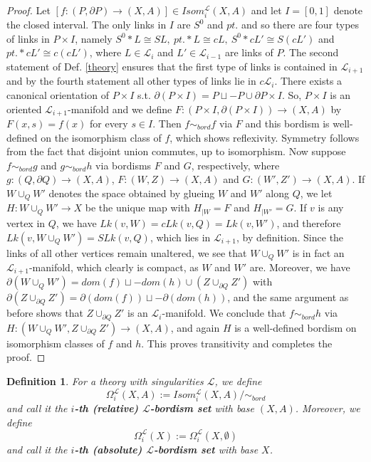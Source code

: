 \documentclass{scrreprt}
\newtheorem{definition}[prop]{Definition}
\begin{document}
\begin{proof}
Let $[f: (P, \partial P) \to (X,A)] \in Isom_{i}^{\mathcal{L}}(X,A)$ and let $I=[0,1]$ denote the closed interval. The only links in $I$ are $S^0$ and $pt.$ and so there are four types of links in $P \times I$, namely $S^0 * L \cong SL,\  pt. * L \cong cL,\  S^0 * cL' \cong S(cL')$ and $pt. * cL' \cong c(cL')$, where $L \in \mathcal{L}_i$ and $L' \in \mathcal{L}_{i-1}$ are links of $P$. The second statement of Def. \ref{theory} ensures that the first type of links is contained in $\mathcal{L}_{i+1}$ and by the fourth statement all other types of links lie in $c \mathcal{L}_i$. There exists a canonical orientation of $P \times I$ s.t. $\partial (P \times I)= P \sqcup -P \cup \partial P \times I$. So, $P \times I$ is an oriented $\mathcal{L}_{i+1}$-manifold and we define $F: (P \times I, \partial(P \times I)) \to (X,A)$ by $F(x,s)=f(x)$ for every $s \in I$. Then $f \sim_{bord} f$ via $F$ and this bordism is well-defined on the isomorphism class of $f$, which shows reflexivity. Symmetry follows from the fact that disjoint union commutes, up to isomorphism. Now suppose $f \sim_{bord} g$ and $g \sim_{bord} h$ via bordisms $F$ and $G$, respectively, where $g: (Q, \partial Q) \to (X,A)$, $F: (W,Z) \to (X,A)$ and $G: (W',Z') \to (X,A)$. If $W \cup_{Q} W'$ denotes the space obtained by glueing $W$ and $W'$ along $Q$, we let $H: W \cup_{Q} W' \to X$ be the unique map with $H_{|W} = F$ and $H_{|W'}=G$. If $v$ is any vertex in $Q$, we have $Lk(v,W)=cLk(v,Q)=Lk(v,W')$, and therefore $Lk(v,W \cup_{Q} W') = SLk(v,Q)$, which lies in $\mathcal{L}_{i+1}$, by definition. Since the links of all other vertices remain unaltered, we see that $W \cup_{Q} W'$ is in fact an $\mathcal{L}_{i+1}$-manifold, which clearly is compact, as $W$ and $W'$ are. Moreover, we have $\partial (W \cup_{Q} W')= dom(f) \sqcup -dom(h) \cup (Z \cup_{\partial Q} Z')$ with $\partial (Z \cup_{\partial Q} Z')= \partial (dom(f)) \sqcup - \partial (dom(h))$, and the same argument as before shows that $Z \cup_{\partial Q} Z'$ is an $\mathcal{L}_i$-manifold. We conclude that $f \sim_{bord} h$ via $H: (W \cup_{Q} W',Z \cup_{\partial Q} Z') \to (X,A)$, and again $H$ is a well-defined bordism on isomorphism classes of $f$ and $h$. This proves transitivity and completes the proof.
\end{proof}

\begin{definition}\label{bordismgroup}
For a theory with singularities $\mathcal{L}$, we define  
\begin{equation*}
\Omega_i^\mathcal{L}(X,A):= Isom_i^\mathcal{L}(X,A)/ \sim_{bord}
\end{equation*}
 and call it the \textbf{$i$-th (relative) $\mathcal{L}$-bordism set} with base $(X,A)$. Moreover, we define
\begin{equation*}
\Omega_i^\mathcal{L}(X):=\Omega_i^\mathcal{L}(X, \emptyset)
\end{equation*}
and call it the \textbf{$i$-th (absolute) $\mathcal{L}$-bordism set} with base $X$.
\end{definition}
\end{document}
